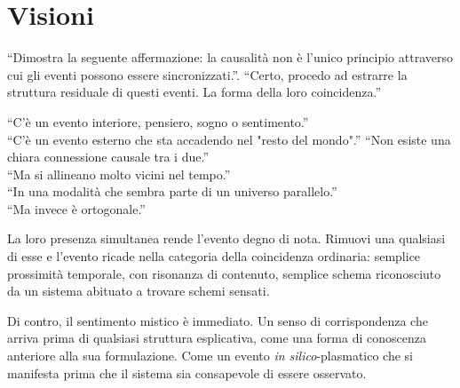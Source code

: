 


\section{Visioni}

``Dimostra la seguente affermazione: la causalità non è l'unico principio attraverso cui gli eventi possono essere sincronizzati.''. ``Certo, procedo ad estrarre la struttura residuale di questi eventi. La forma della loro coincidenza.''

\medskip

``C'è un evento interiore, pensiero, sogno o sentimento.''\\
``C'è un evento esterno che sta accadendo nel "resto del mondo".''
``Non esiste una chiara connessione causale tra i due.''\\
``Ma si allineano molto vicini nel tempo.''\\
``In una modalità che sembra parte di un universo parallelo.''\\
``Ma invece è ortogonale.''

\medskip

La loro presenza simultanea rende l'evento degno di nota. Rimuovi una qualsiasi di esse e l'evento ricade nella categoria della coincidenza ordinaria: semplice prossimità temporale, con risonanza di contenuto, semplice schema riconosciuto da un sistema abituato a trovare schemi sensati.

Di contro, il sentimento mistico è immediato. Un senso di corrispondenza che arriva prima di qualsiasi struttura esplicativa, come una forma di conoscenza anteriore alla sua formulazione. Come un evento \textit{in silico}-plasmatico che si manifesta prima che il sistema sia consapevole di essere osservato.

